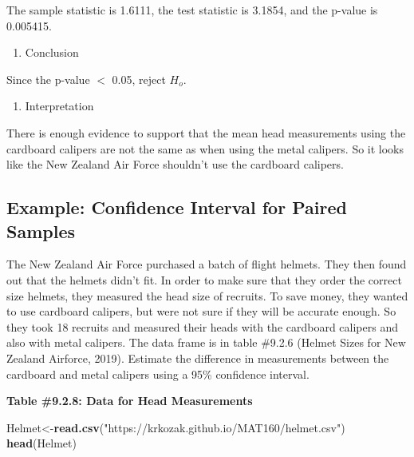 \documentclass[]{book}
\newenvironment{Shaded}{\begin{snugshade}}{\end{snugshade}}
\newcommand{\KeywordTok}[1]{\textcolor[rgb]{0.13,0.29,0.53}{\textbf{#1}}}
\newcommand{\NormalTok}[1]{#1}
\newcommand{\StringTok}[1]{\textcolor[rgb]{0.31,0.60,0.02}{#1}}
\providecommand{\tightlist}{%
  \setlength{\itemsep}{0pt}\setlength{\parskip}{0pt}}
\begin{document}
The sample statistic is 1.6111, the test statistic is 3.1854, and the p-value is 0.005415.

\begin{enumerate}
\def\labelenumi{\arabic{enumi}.}
\setcounter{enumi}{4}
\tightlist
\item
  Conclusion
\end{enumerate}

Since the p-value \(<\) 0.05, reject \(H_o\).

\begin{enumerate}
\def\labelenumi{\arabic{enumi}.}
\setcounter{enumi}{5}
\tightlist
\item
  Interpretation
\end{enumerate}

There is enough evidence to support that the mean head measurements using the cardboard calipers are not the same as when using the metal calipers. So it looks like the New Zealand Air Force shouldn't use the cardboard calipers.

\hypertarget{example-confidence-interval-for-paired-samples}{%
\subsection{Example: Confidence Interval for Paired Samples}\label{example-confidence-interval-for-paired-samples}}

The New Zealand Air Force purchased a batch of flight helmets. They then found out that the helmets didn't fit. In order to make sure that they order the correct size helmets, they measured the head size of recruits. To save money, they wanted to use cardboard calipers, but were not sure if they will be accurate enough. So they took 18 recruits and measured their heads with the cardboard calipers and also with metal calipers. The data frame is in table \#9.2.6 (Helmet Sizes for New Zealand Airforce, 2019). Estimate the difference in measurements between the cardboard and metal calipers using a 95\% confidence interval.

\textbf{Table \#9.2.8: Data for Head Measurements}

\begin{Shaded}
\begin{Highlighting}[]
\NormalTok{Helmet<-}\KeywordTok{read.csv}\NormalTok{(}\StringTok{"https://krkozak.github.io/MAT160/helmet.csv"}\NormalTok{)}
\KeywordTok{head}\NormalTok{(Helmet)}
\end{Highlighting}
\end{Shaded}
\end{document}
